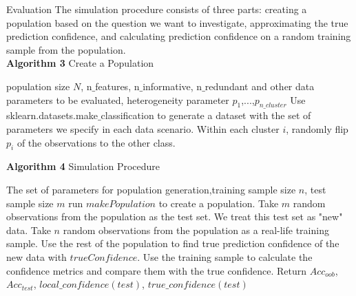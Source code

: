 \documentclass[12pt]{pom_thesis}
\begin{document}
\begin{chapter}{Evaluation}
The simulation procedure consists of three parts: creating a population based on the question we want to investigate, approximating the true prediction confidence, and calculating prediction confidence on a random training sample from the population. \\

\hline
\vspace{0.05in}
\textbf{Algorithm 3} Create a Population
\vspace{0.05in}
\hline
\begin{algorithm}
\label{make_population}
\label{split}
\begin{algorithmc}
 {population size $N$, n$\_$features, n$\_$informative, n$\_$redundant and other data parameters to be evaluated, heterogeneity parameter $p_1$,...,$p_{n\_cluster}$}
 \State Use sklearn.datasets.make$\_$classification to generate a dataset with the set of parameters we specify in each data scenario. 
 \State Within each cluster $i$, randomly flip $p_i$ of the observations to the other class.
\EndProcedure
\newline
\end{algorithmc}
\end{algorithm}

\newline
\hline
\vspace{0.05in}
\textbf{Algorithm 4} Simulation Procedure
\vspace{0.05in}
\hline
\begin{algorithm}
\label{simulation}
\label{split}
\begin{algorithmc}
 {The set of parameters for population generation,training sample size $n$, test sample size $m$}
 \State run $makePopulation$ to create a population.
 \State Take $m$ random observations from the population as the test set. We treat this test set as "new" data.
 \State Take $n$ random observations from the population as a real-life training sample.
 \State Use the rest of the population to find true prediction confidence of the new data with $trueConfidence$.
 \State Use the training sample to calculate the confidence metrics and compare them with the true confidence. 
 \State Return $Acc_{oob}$, $Acc_{test}$, $local\_confidence(test)$, $true\_confidence(test)$ 
 
\EndProcedure
\newline
\end{algorithmc}
\end{algorithm}



\end{chapter}
\end{document}
